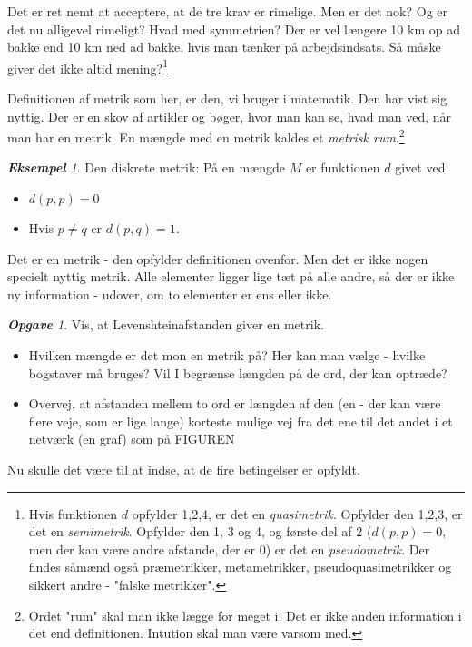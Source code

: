 \documentclass[a4paper, 12pt]{article}
\theoremstyle{remark}
\newtheorem{Eksempel}{\textbf{Eksempel}}
\newtheorem{Opgave}{\textbf{Opgave}}
\begin{document}
Det er ret nemt at acceptere, at de tre krav er rimelige. Men er det nok? Og er det nu alligevel rimeligt? Hvad med symmetrien? Der er vel længere 10 km op ad bakke end 10 km ned ad bakke, hvis man tænker på arbejdsindsats. Så måske giver det ikke altid mening?\footnote{ Hvis funktionen $d$ opfylder 1,2,4, er det en \emph{quasimetrik}. Opfylder den 1,2,3, er det en \emph{semimetrik}. Opfylder den 1, 3 og 4, og første del af 2 ($d(p,p)=0$, men der kan være andre afstande, der er $0$)  er det en \emph{pseudometrik}.  Der findes såmænd også præmetrikker, metametrikker, pseudoquasimetrikker og sikkert andre - "falske metrikker". }

Definitionen af metrik som her, er den, vi bruger i matematik. Den har vist sig nyttig. Der er en skov af artikler og bøger, hvor man kan se, hvad man ved, når man har  en metrik. En mængde med en metrik kaldes et \emph{metrisk rum}.\footnote{Ordet "rum"  skal man ikke lægge for meget i. Det er ikke anden information i det end definitionen. Intution skal man være varsom med.}
\begin{Eksempel}
Den diskrete metrik: På en mængde $M$ er funktionen $d$ givet ved. 
\begin{itemize}
\item $d(p,p)=0$
\item Hvis $p\neq q$ er $d(p,q)=1$.
\end{itemize}
Det er en metrik - den opfylder definitionen ovenfor. Men det er ikke nogen specielt nyttig metrik. Alle elementer ligger lige tæt på alle andre, så der er ikke ny information - udover, om  to elementer er ens eller ikke.
\end{Eksempel}
\begin{Opgave}\label{Opg:Levensh} Vis, at Levenshteinafstanden giver en metrik. 
\begin{itemize}
\item Hvilken mængde er det mon en metrik på? Her kan man vælge - hvilke bogstaver må bruges? Vil I begrænse længden på de ord, der kan optræde? 
\item Overvej, at afstanden mellem to ord er længden af den (en - der kan være flere veje, som er lige lange)  korteste mulige vej fra det ene til det andet i et netværk (en graf) som på FIGUREN

\end{itemize}
Nu skulle det være til at indse, at de fire betingelser er opfyldt. 
\end{Opgave}
\end{document}
